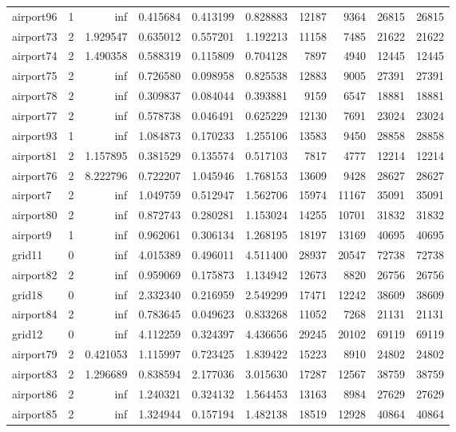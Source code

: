 \begin{longtable}{|l|r|r|r|r|r|r|r|r|r|}
airport96 & 1 & inf & 0.415684 & 0.413199 & 0.828883 & 12187 & 9364 & 26815 & 26815 \\
airport73 & 2 & 1.929547 & 0.635012 & 0.557201 & 1.192213 & 11158 & 7485 & 21622 & 21622 \\
airport74 & 2 & 1.490358 & 0.588319 & 0.115809 & 0.704128 & 7897 & 4940 & 12445 & 12445 \\
airport75 & 2 & inf & 0.726580 & 0.098958 & 0.825538 & 12883 & 9005 & 27391 & 27391 \\
airport78 & 2 & inf & 0.309837 & 0.084044 & 0.393881 & 9159 & 6547 & 18881 & 18881 \\
airport77 & 2 & inf & 0.578738 & 0.046491 & 0.625229 & 12130 & 7691 & 23024 & 23024 \\
airport93 & 1 & inf & 1.084873 & 0.170233 & 1.255106 & 13583 & 9450 & 28858 & 28858 \\
airport81 & 2 & 1.157895 & 0.381529 & 0.135574 & 0.517103 & 7817 & 4777 & 12214 & 12214 \\
airport76 & 2 & 8.222796 & 0.722207 & 1.045946 & 1.768153 & 13609 & 9428 & 28627 & 28627 \\
airport7 & 2 & inf & 1.049759 & 0.512947 & 1.562706 & 15974 & 11167 & 35091 & 35091 \\
airport80 & 2 & inf & 0.872743 & 0.280281 & 1.153024 & 14255 & 10701 & 31832 & 31832 \\
airport9 & 1 & inf & 0.962061 & 0.306134 & 1.268195 & 18197 & 13169 & 40695 & 40695 \\
grid11 & 0 & inf & 4.015389 & 0.496011 & 4.511400 & 28937 & 20547 & 72738 & 72738 \\
airport82 & 2 & inf & 0.959069 & 0.175873 & 1.134942 & 12673 & 8820 & 26756 & 26756 \\
grid18 & 0 & inf & 2.332340 & 0.216959 & 2.549299 & 17471 & 12242 & 38609 & 38609 \\
airport84 & 2 & inf & 0.783645 & 0.049623 & 0.833268 & 11052 & 7268 & 21131 & 21131 \\
grid12 & 0 & inf & 4.112259 & 0.324397 & 4.436656 & 29245 & 20102 & 69119 & 69119 \\
airport79 & 2 & 0.421053 & 1.115997 & 0.723425 & 1.839422 & 15223 & 8910 & 24802 & 24802 \\
airport83 & 2 & 1.296689 & 0.838594 & 2.177036 & 3.015630 & 17287 & 12567 & 38759 & 38759 \\
airport86 & 2 & inf & 1.240321 & 0.324132 & 1.564453 & 13163 & 8984 & 27629 & 27629 \\
airport85 & 2 & inf & 1.324944 & 0.157194 & 1.482138 & 18519 & 12928 & 40864 & 40864 \\

\end{longtable}
